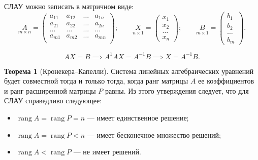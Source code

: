 \documentclass[a5paper, 11pt]{extbook}
\theoremstyle{definition}
\newtheorem{theorem}{Теорема}[section]
\theoremstyle{definition}
\theoremstyle{definition}
\DeclareMathOperator{\rang}{rang}
\begin{document}
СЛАУ можно записать в матричном виде:
\begin{equation*}
    \underset{m \times n}{A} =
    \begin{pmatrix}
        a_{11} & a_{12} & \ldots & a_{1n} \\
        a_{21} & a_{22} & \ldots & a_{2n} \\
        \ldots & \ldots & \ldots & \ldots \\
        a_{m1} & a_{m2} & \ldots & a_{mn} \\
    \end{pmatrix};
    \qquad
    \underset{n \times 1}{X} =
    \begin{pmatrix}
        x_1    \\
        x_2    \\
        \ldots \\
        x_n
    \end{pmatrix};
    \qquad
    \underset{m \times 1}{B} =
    \begin{pmatrix}
        b_1    \\
        b_2    \\
        \ldots \\
        b_m
    \end{pmatrix}.
\end{equation*}

\begin{equation*}
    AX = B
    \implies
    A^{1} A X = A^{-1} B
    \implies
    X = A^{-1} B.
\end{equation*}

\begin{theorem}[Кронекера–Капелли]
    Система линейных алгебраических уравнений будет совместной тогда и только тогда, когда ранг матрицы \(A\) ее коэффициентов и ранг расширенной матрицы \(P\) равны. Из этого утверждения следует, что для СЛАУ справедливо следующее:
    \begin{itemize}
        \item \(\rang A = \rang P = n\) — имеет единственное решение;
        \item \(\rang A = \rang P < n\) — имеет бесконечное множество решений;
        \item \(\rang A < \rang P\) — не имеет решений.
    \end{itemize}
\end{theorem}
\end{document}
